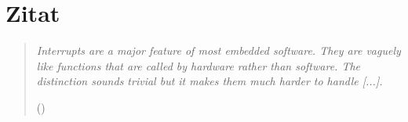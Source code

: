 \chapter*{Zitat}
\label{cha:Zitat}

\thispagestyle{empty}

\begin{center}
\begin{minipage}{14cm}
\begin{verse}
\textit{Interrupts are a major feature of most embedded software. They are vaguely like functions
	that are called by hardware rather than software. The distinction sounds trivial but it makes
	them much harder to handle [...].}

()
\end{verse}
\end{minipage}
\end{center}
